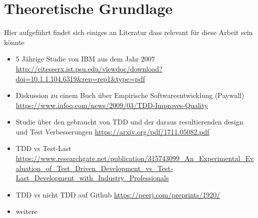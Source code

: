 \section{Theoretische Grundlage}
Hier aufgeführt findet sich einiges an Literatur dass relevant für diese Arbeit
sein könnte

\begin{itemize}
    \item 5 Jährige Studie von IBM aus dem Jahr 2007
    \url{http://citeseerx.ist.psu.edu/viewdoc/download?doi=10.1.1.104.6319&rep=rep1&type=pdf}
    \item Diskussion zu einem Buch über Empirische Softwareentwicklung (Paywall)
    \url{https://www.infoq.com/news/2009/03/TDD-Improves-Quality}
    \item Studie über den gebraucht von TDD und der daraus resultierenden design
    und Test Verbesserungen
    \url{https://arxiv.org/pdf/1711.05082.pdf}
    \item TDD vs Test-Last
    \url{https://www.researchgate.net/publication/315743099_An_Experimental_Evaluation_of_Test_Driven_Development_vs_Test-Last_Development_with_Industry_Professionals}
    \item TDD vs nicht TDD auf Github
    \url{https://peerj.com/preprints/1920/}
    \item weitere
\end{itemize}
